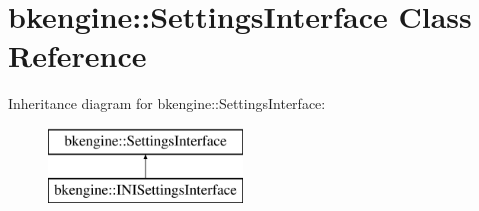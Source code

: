 \hypertarget{classbkengine_1_1SettingsInterface}{}\section{bkengine\+:\+:Settings\+Interface Class Reference}
\label{classbkengine_1_1SettingsInterface}
Inheritance diagram for bkengine\+:\+:Settings\+Interface\+:\begin{figure}[H]
\begin{center}
\leavevmode
\includegraphics[height=2.000000cm]{classbkengine_1_1SettingsInterface}
\end{center}
\end{figure}
